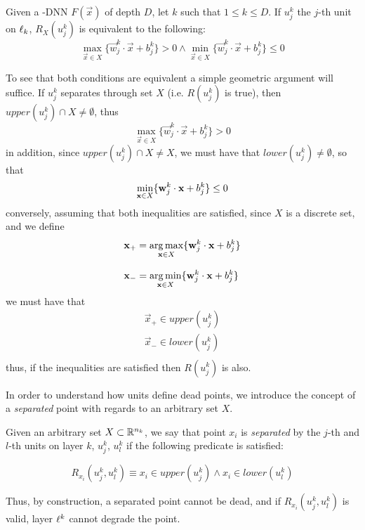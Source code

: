 \begin{remark}\label{rmk:separationUsingGeometry}
Given a \ReLU-DNN $F(\vec{x})$ of depth $D$, let $k$ such that $1\leq k \leq D$. If $u_j^k$ the $j$-th unit on $\layer_k$, $R_X(u_j^k)$ is equivalent to the following:
\begin{equation}
\displaystyle\max_{\vec{x}\in X}\{\vec{w}_j^k\cdot\vec{x}+b_j^k\} > 0
\wedge 
\displaystyle\min_{\vec{x}\in X}\{\vec{w}_j^k\cdot\vec{x}+b_j^k\} \leq 0
\end{equation}
\end{remark}
To see that both conditions are equivalent a simple geometric argument will suffice. If $u_j^k$ separates through set $X$ (i.e. $R(u_j^k)$ is true), then $upper(u_j^k)\cap X\neq\emptyset$, thus 
\begin{equation}
    \max_{\vec{x}\in X}\{\vec{w}_j^k\cdot\vec{x}+b_j^k\} > 0
\end{equation}
in addition, since $upper(u_j^k)\cap X\neq X$, we must have that $lower(u_j^k)\neq \emptyset$, so that 
\begin{equation}
 \displaystyle\min_{\vec{x}\in X}\{\vec{w}_j^k\cdot\vec{x}+b_j^k\} \leq 0\\     
\end{equation}
conversely, assuming that both inequalities are satisfied, since $X$ is a discrete set, and we define 
\begin{equation}
\begin{array}{l}
    \vec{x}_{+} = \displaystyle\argmax_{\vec{x}\in X}\{\vec{w}_j^k\cdot\vec{x}+b_j^k\}\\\\
    \vec{x}_{-} = \displaystyle\argmin_{\vec{x}\in X}\{\vec{w}_j^k\cdot\vec{x}+b_j^k\}\\
\end{array}
\end{equation}
we must have that 
\begin{equation}
\begin{array}{l}
 \vec{x}_{+}\in upper(u_j^k)\\
 \vec{x}_{-}\in lower(u_j^k)\\
 \end{array}
\end{equation} 
thus, if the inequalities are satisfied then $R(u_j^k)$ is also. 

In order to understand how units define dead points, we introduce the concept of a \emph{separated} point with regards to an arbitrary set $X$. 
\begin{definition}\label{def:separatingUnit}
Given an arbitrary set $X\subset\Real{n_k}$, we say that point $x_i$ is \emph{separated} by the $j$-th and $l$-th units on layer $k$, $u_j^k$, $u_l^k$ if the following predicate is satisfied:

\begin{equation}\label{eq:pointPredicate}
    R_{x_i}(u_j^k, u_l^k)\equiv x_i \in upper(u_j^k) \wedge x_i \in lower(u_l^k)
\end{equation}
\end{definition}

Thus, by construction, a separated point cannot be dead, and if $R_{x_i}(u_j^k, u_l^k)$ is valid, layer $\layer^k$ cannot degrade the point. 
\\\\

 